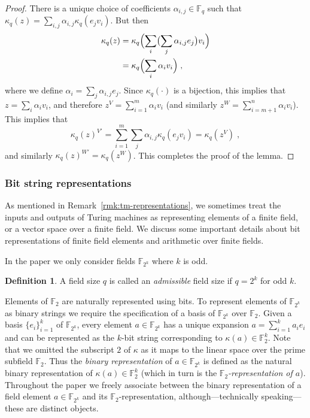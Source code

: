 \documentclass[11pt]{article}
\theoremstyle{definition}
\newtheorem{definition}[theorem]{Definition}
\newcommand{\F}{\ensuremath{\mathbb{F}}}
\newcommand{\downsize}{\kappa}
\begin{document}
\begin{proof}
  There is a unique choice of coefficients $\alpha_{i, j} \in \F_q$ such that
  $\downsize_q(z) = \sum_{i, j} \alpha_{i, j} \downsize_q(e_j v_i)$.
  But then
  \begin{align*}
    \downsize_q(z) & = \downsize_q \Bigl( \sum_i \bigl ( \sum_j
                     \alpha_{i, j} e_j \bigr) v_i \Bigr) \\
                   & = \downsize_q \Bigl( \sum_i \alpha_i v_i \Bigr)\;,
  \end{align*}
  where we define $\alpha_i = \sum_j \alpha_{i, j} e_j$.
  Since $\downsize_q(\cdot)$ is a bijection, this implies that $z = \sum_i
  \alpha_i v_i$, and therefore $z^V = \sum_{i=1}^m \alpha_i v_i$ (and similarly
  $z^W = \sum_{i=m+1}^n \alpha_i v_i$).
  This implies that
  \begin{equation*}
	  \downsize_q(z)^{V'} = \sum_{i=1}^m \sum_{j} \alpha_{i, j}
    \downsize_q(e_j v_i) = \downsize_q (z^V)\;,
  \end{equation*}
  and similarly $\downsize_q(z)^{W'} = \downsize_q(z^W)$.
  This completes the proof of the lemma.
\end{proof}

\subsubsection{Bit string representations}
\label{sec:ff-representations}

As mentioned in Remark~\ref{rmk:tm-representations}, we sometimes treat the
inputs and outputs of Turing machines as representing elements of a finite
field, or a vector space over a finite field.
We discuss some important details about bit representations of finite field
elements and arithmetic over finite fields.

In the paper we only consider fields $\F_{2^k}$ where $k$ is odd. 

\begin{definition}\label{def:admissible-size}
  A field size $q$ is called an \emph{admissible} field size if $q=2^k$ for odd
  $k$.
\end{definition}

Elements of $\F_2$ are naturally represented using bits. 
To represent elements of $\F_{2^k}$ as binary strings we require the
specification of a basis of $\F_{2^k}$ over $\F_2$.
Given a basis $\{e_i\}_{i=1}^k$ of $\F_{2^k}$, every element $a \in \F_{2^k}$
has a unique expansion $a = \sum_{i=1}^k a_i e_i$ and can be represented as the
$k$-bit string corresponding to $\downsize(a) \in \F_2^k$.
Note that we omitted the subscript $2$ of $\downsize$ as it maps to the linear
space over the prime subfield $\F_2$.
Thus the \emph{binary representation} of $a \in \F_{2^k}$ is defined as the
natural binary representation of $\downsize(a) \in \F_2^k$ (which in turn is the
\emph{$\F_2$-representation of $a$}).
Throughout the paper we freely associate between the binary representation of a
field element $a \in \F_{2^k}$ and its $\F_2$-representation,
although---technically speaking---these are distinct objects.
\end{document}
